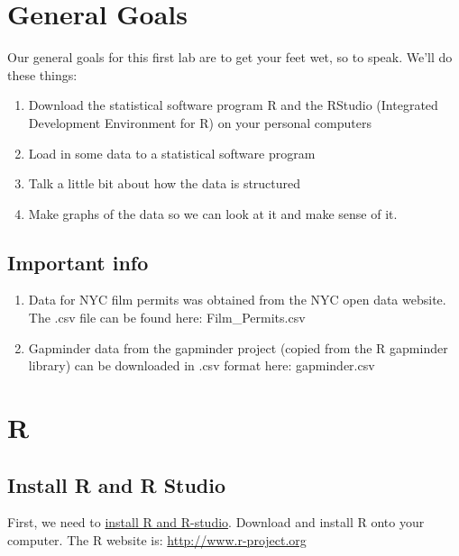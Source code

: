 \documentclass[
]{book}
\providecommand{\tightlist}{%
  \setlength{\itemsep}{0pt}\setlength{\parskip}{0pt}}
\begin{document}
\hypertarget{general-goals}{%
\section{General Goals}\label{general-goals}}

Our general goals for this first lab are to get your feet wet, so to speak. We'll do these things:

\begin{enumerate}
\def\labelenumi{\arabic{enumi}.}
\tightlist
\item
  Download the statistical software program R and the RStudio (Integrated Development Environment for R) on your personal computers
\item
  Load in some data to a statistical software program
\item
  Talk a little bit about how the data is structured
\item
  Make graphs of the data so we can look at it and make sense of it.
\end{enumerate}

\hypertarget{important-info}{%
\subsection{Important info}\label{important-info}}

\begin{enumerate}
\def\labelenumi{\arabic{enumi}.}
\item
  Data for NYC film permits was obtained from the NYC open data website. The .csv file can be found here: Film\_Permits.csv
\item
  Gapminder data from the gapminder project (copied from the R gapminder library) can be downloaded in .csv format here: gapminder.csv
\end{enumerate}

\hypertarget{r-1}{%
\section{R}\label{r-1}}

\hypertarget{install-r-and-r-studio}{%
\subsection{Install R and R Studio}\label{install-r-and-r-studio}}

First, we need to \protect\hyperlink{0}{install R and R-studio}. Download and install R onto your computer. The R website is: \url{http://www.r-project.org}
\end{document}

